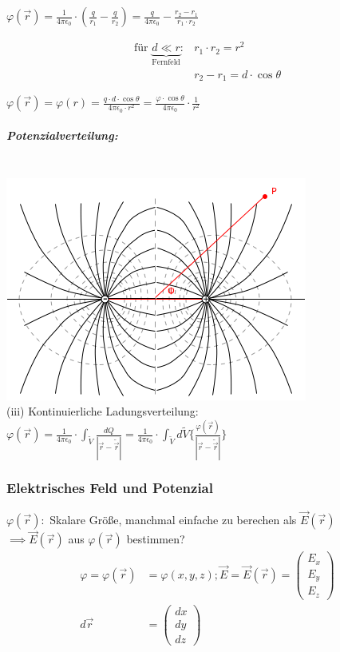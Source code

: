 \documentclass[11pt]{article}
\begin{document}
$ \varphi(\vec{r})=\frac{1}{4\pi\epsilon_0}\cdot(\frac{q}{r_1}-\frac{q}{r_2})=\frac{q}{4\pi\epsilon_0}-\frac{r_2-r_1}{r_1\cdot r_2} $

\begin{align*}
	\text{für } \underbrace{d\ll r}_{\text{Fernfeld}}:& r_1\cdot r_2 = r^2\\
	&r_2-r_1=d\cdot\cos\theta
\end{align*}

$ \varphi(\vec{r})=\varphi(r)=\frac{q\cdot d\cdot \cos\theta}{4\pi\epsilon_0\cdot r^2} = \frac{\varphi\cdot\cos\theta}{4\pi\epsilon_0}\cdot\frac{1}{r^2} $

\subparagraph{Potenzialverteilung:}
\hfill\\
\includegraphics{skizzen/14/14_7B1}
\\
(iii) Kontinuierliche Ladungsverteilung:\\

$ \displaystyle\varphi(\vec{r})=\frac{1}{4\pi\epsilon_0}\cdot\int_{\tilde{V}} \frac{dQ}{|\vec{r}-\tilde{\vec{r}}|} = \frac{1}{4\pi\epsilon_0}\cdot\int_{\tilde{V}} d\tilde{V}\bigg\{\frac{\varphi(\vec{r})}{|\vec{r}-\tilde{\vec{r}}|}\bigg\}$\\

\subsubsection{Elektrisches Feld und Potenzial}

$ \varphi(\vec{r}): $ Skalare Größe, manchmal einfache zu berechen als $ \vec{E}(\vec{r}) $\\

$\implies \vec{E}(\vec{r}) $ aus $ \varphi(\vec{r}) $ bestimmen?\\

\begin{align*}
	\varphi=\varphi(\vec{r}) &= \varphi(x,y,z); \vec{E}= \vec{E}(\vec{r})=\begin{pmatrix}E_x\\ E_y\\ E_z\end{pmatrix}\\
	d\vec{r}&= \begin{pmatrix}dx\\ dy\\ dz\end{pmatrix}
\end{align*}
\end{document}

